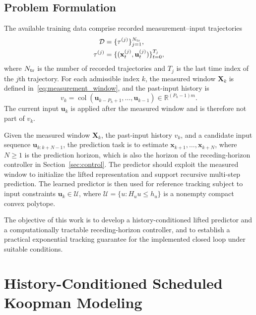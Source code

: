 \documentclass[journal]{IEEEtran}
\theoremstyle{plain}
\theoremstyle{definition}
\newcommand{\vx}{\mathbf{x}}
\newcommand{\vu}{\mathbf{u}}
\newcommand{\mX}{\mathbf{X}}
\newcommand{\R}{\mathbb{R}}
\newcommand{\col}{\operatorname{col}}
\begin{document}
\subsection{Problem Formulation}
\label{sec:problem}
The available training data comprise recorded measurement--input trajectories
\begin{equation}
\begin{aligned}
\mathcal D &= \{\tau^{(j)}\}_{j=1}^{N_{\rm tr}},\\
\tau^{(j)} &= \{(\vx_t^{(j)},\vu_t^{(j)})\}_{t=0}^{T_j},
\end{aligned}
\label{eq:training_data}
\end{equation}
where $N_{\rm tr}$ is the number of recorded trajectories and $T_j$ is the last time index of the $j$th trajectory.
For each admissible index $k$, the measured window $\mX_k$ is defined in~\eqref{eq:measurement_window}, and the past-input history is
\begin{equation}
v_k = \col(\vu_{k-P_h+1},\ldots,\vu_{k-1}) \in \R^{(P_h-1)m}.
\label{eq:past_input_history}
\end{equation}
The current input $\vu_k$ is applied after the measured window and is therefore not part of $v_k$.

Given the measured window $\mX_k$, the past-input history $v_k$, and a candidate input sequence $\vu_{k:k+N-1}$, the prediction task is to estimate $\vx_{k+1},\ldots,\vx_{k+N}$, where $N\ge1$ is the prediction horizon, which is also the horizon of the receding-horizon controller in Section~\ref{sec:control}. The predictor should exploit the measured window to initialize the lifted representation and support recursive multi-step prediction. The learned predictor is then used for reference tracking subject to input constraints $\vu_k\in\mathcal U$, where $\mathcal U=\{u:H_uu\leq h_u\}$ is a nonempty compact convex polytope.

The objective of this work is to develop a history-conditioned lifted predictor and a computationally tractable receding-horizon controller, and to establish a practical exponential tracking guarantee for the implemented closed loop under suitable conditions.

\section{History-Conditioned Scheduled Koopman Modeling}
\label{sec:model}
\end{document}
